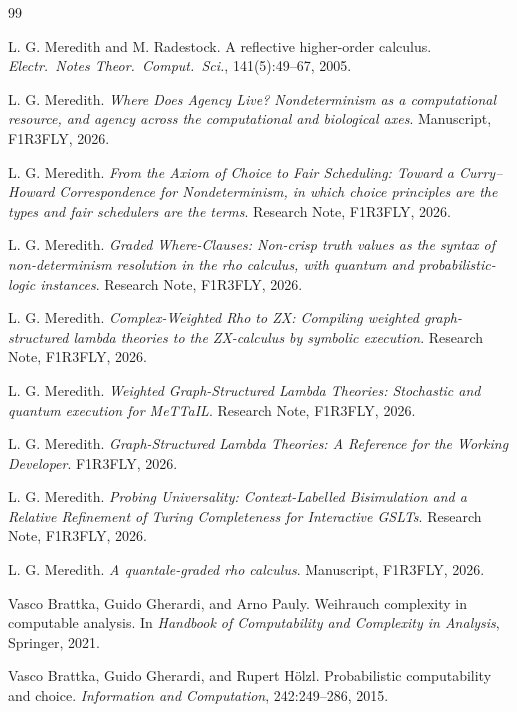 \documentclass[11pt]{article}
\theoremstyle{definition}
\theoremstyle{plain}
\theoremstyle{remark}
\begin{document}
\begin{thebibliography}{99}

 L. G. Meredith and M. Radestock. A reflective higher-order
calculus. \emph{Electr.\ Notes Theor.\ Comput.\ Sci.}, 141(5):49--67, 2005.

 L. G. Meredith. \emph{Where Does Agency Live? Nondeterminism as
a computational resource, and agency across the computational and biological axes}.
Manuscript, F1R3FLY, 2026.

 L. G. Meredith. \emph{From the Axiom of Choice to Fair
Scheduling: Toward a Curry--Howard Correspondence for Nondeterminism, in which choice
principles are the types and fair schedulers are the terms}. Research Note, F1R3FLY,
2026.

 L. G. Meredith. \emph{Graded Where-Clauses: Non-crisp
truth values as the syntax of non-determinism resolution in the rho calculus, with
quantum and probabilistic-logic instances}. Research Note, F1R3FLY, 2026.

 L. G. Meredith. \emph{Complex-Weighted Rho to ZX: Compiling
weighted graph-structured lambda theories to the ZX-calculus by symbolic execution}.
Research Note, F1R3FLY, 2026.

 L. G. Meredith. \emph{Weighted Graph-Structured Lambda
Theories: Stochastic and quantum execution for MeTTaIL}. Research Note, F1R3FLY, 2026.

 L. G. Meredith. \emph{Graph-Structured Lambda Theories: A
Reference for the Working Developer}. F1R3FLY, 2026.

 L. G. Meredith. \emph{Probing Universality: Context-Labelled
Bisimulation and a Relative Refinement of Turing Completeness for Interactive GSLTs}.
Research Note, F1R3FLY, 2026.

 L. G. Meredith. \emph{A quantale-graded rho calculus}.
Manuscript, F1R3FLY, 2026.

 Vasco Brattka, Guido Gherardi, and Arno Pauly. Weihrauch
complexity in computable analysis. In \emph{Handbook of Computability and Complexity in
Analysis}, Springer, 2021.

 Vasco Brattka, Guido Gherardi, and Rupert H\"olzl.
Probabilistic computability and choice. \emph{Information and Computation},
242:249--286, 2015.


\end{thebibliography}
\end{document}
